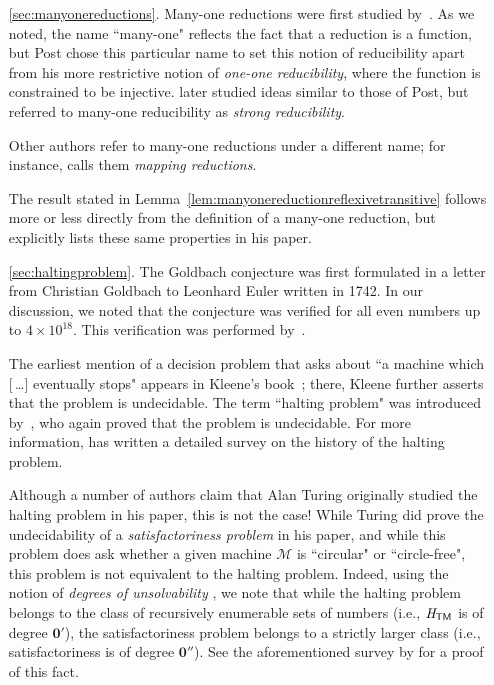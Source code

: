 \begin{enumerate}
\item[\ref{sec:manyonereductions}.] Many-one reductions were first studied by~\citet{Post1944RecursivelyEnumerableSets}. As we noted, the name ``many-one" reflects the fact that a reduction is a function, but Post chose this particular name to set this notion of reducibility apart from his more restrictive notion of \emph{one-one reducibility}, where the function is constrained to be injective. \citet{Shapiro1956DegreesOfComputability} later studied ideas similar to those of Post, but referred to many-one reducibility as \emph{strong reducibility}.

Other authors refer to many-one reductions under a different name; for instance, \cite{Sipser2013TheoryOfComputation3rdEd} calls them \emph{mapping reductions}.

The result stated in Lemma~\ref{lem:manyonereductionreflexivetransitive} follows more or less directly from the definition of a many-one reduction, but \citet{Shapiro1956DegreesOfComputability} explicitly lists these same properties in his paper.

\item[\ref{sec:haltingproblem}.] The Goldbach conjecture was first formulated in a letter from Christian Goldbach to Leonhard Euler written in 1742. In our discussion, we noted that the conjecture was verified for all even numbers up to $4 \times 10^{18}$. This verification was performed by~\citet*{OliveiraESilva2014EmpricalVerificationGoldbach}.

The earliest mention of a decision problem that asks about ``a machine which \textup{[\,\dots]} eventually stops" appears in Kleene's book~\citeyearpar[chapter XIII, section 71]{Kleene1952IntroductionToMetamathematics}; there, Kleene further asserts that the problem is undecidable. The term ``halting problem" was introduced by~\citet[chapter 5, section 2]{Davis1958ComputabilityUnsolvability}, who again proved that the problem is undecidable. For more information, \citet{Lucas2021OriginsHaltingProblem} has written a detailed survey on the history of the halting problem.

Although a number of authors claim that Alan Turing originally studied the halting problem in his \citeyear{Turing1936OnComputableNumbers} paper, this is not the case! While Turing did prove the undecidability of a \emph{satisfactoriness problem} in his paper, and while this problem does ask whether a given machine $\mathcal{M}$ is ``circular" or ``circle-free", this problem is not equivalent to the halting problem. Indeed, using the notion of \emph{degrees of unsolvability} \citep{Post1944RecursivelyEnumerableSets}, we note that while the halting problem belongs to the class of recursively enumerable sets of numbers (i.e., $\mathit{H}_{\textsf{TM}}$ is of degree $\mathbf{0}'$), the satisfactoriness problem belongs to a strictly larger class (i.e., satisfactoriness is of degree $\mathbf{0}''$). See the aforementioned survey by \citet{Lucas2021OriginsHaltingProblem} for a proof of this fact.


\end{enumerate}
